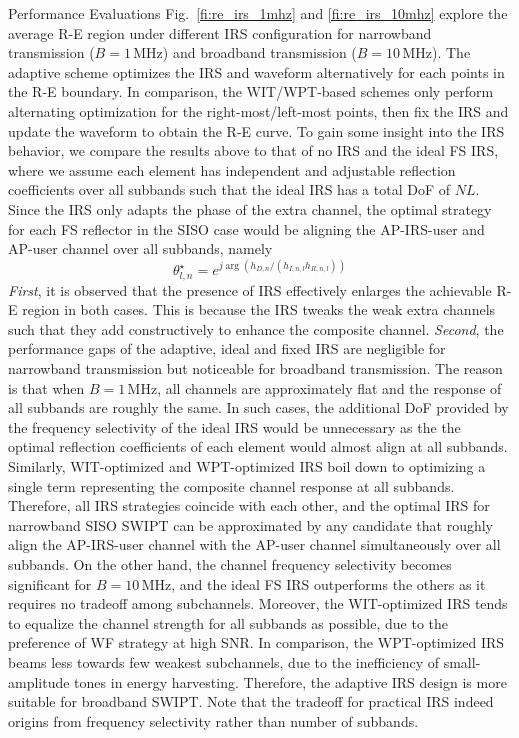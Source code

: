 \documentclass[journal]{IEEEtran}
\begin{document}
\begin{section}{Performance Evaluations}
		Fig.~\ref{fi:re_irs_1mhz} and \ref{fi:re_irs_10mhz} explore the average R-E region under different IRS configuration for narrowband transmission ($B=1\,\si{\MHz}$) and broadband transmission ($B=10\,\si{\MHz}$). The adaptive scheme optimizes the IRS and waveform alternatively for each points in the R-E boundary. In comparison, the WIT/WPT-based schemes only perform alternating optimization for the right-most/left-most points, then fix the IRS and update the waveform to obtain the R-E curve. To gain some insight into the IRS behavior, we compare the results above to that of no IRS and the ideal FS IRS, where we assume each element has independent and adjustable reflection coefficients over all subbands such that the ideal IRS has a total DoF of $NL$. Since the IRS only adapts the phase of the extra channel, the optimal strategy for each FS reflector in the SISO case would be aligning the AP-IRS-user and AP-user channel over all subbands, namely
		\begin{equation}
			\theta_{l,n}^{\star}=e^{j\arg{\left(h_{D,n}/(h_{I,n,l}h_{R,n,l})\right)}}
		\end{equation}
		\textit{First}, it is observed that the presence of IRS effectively enlarges the achievable R-E region in both cases. This is because the IRS tweaks the weak extra channels such that they add constructively to enhance the composite channel. \textit{Second}, the performance gaps of the adaptive, ideal and fixed IRS are negligible for narrowband transmission but noticeable for broadband transmission. The reason is that when $B=1\,\si{\MHz}$, all channels are approximately flat and the response of all subbands are roughly the same. In such cases, the additional DoF provided by the frequency selectivity of the ideal IRS would be unnecessary as the the optimal reflection coefficients of each element would almost align at all subbands. Similarly, WIT-optimized and WPT-optimized IRS boil down to optimizing a single term representing the composite channel response at all subbands. Therefore, all IRS strategies coincide with each other, and the optimal IRS for narrowband SISO SWIPT can be approximated by any candidate that roughly align the AP-IRS-user channel with the AP-user channel simultaneously over all subbands. On the other hand, the channel frequency selectivity becomes significant for $B=10\,\si{\MHz}$, and the ideal FS IRS outperforms the others as it requires no tradeoff among subchannels. Moreover, the WIT-optimized IRS tends to equalize the channel strength for all subbands as possible, due to the preference of WF strategy at high SNR. In comparison, the WPT-optimized IRS beams less towards few weakest subchannels, due to the inefficiency of small-amplitude tones in energy harvesting. Therefore, the adaptive IRS design is more suitable for broadband SWIPT. Note that the tradeoff for practical IRS indeed origins from frequency selectivity rather than number of subbands.
	\end{section}


	
	
\end{document}
